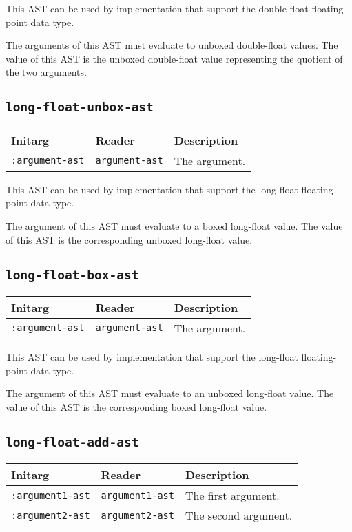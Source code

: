 This AST can be used by implementation that support the double-float
floating-point data type.  

The arguments of this AST must evaluate to unboxed double-float
values.  The value of this AST is the unboxed double-float value
representing the quotient of the two arguments.

\subsection{\texttt{long-float-unbox-ast}}
\label{sec-ast-long-float-unbox}

\begin{tabular}{|l|l|l|}
\hline
Initarg & Reader & Description\\
\hline\hline
\texttt{:argument-ast} & \texttt{argument-ast} & The argument.\\
\hline
\end{tabular}

This AST can be used by implementation that support the long-float
floating-point data type.  

The argument of this AST must evaluate to a boxed long-float value.
The value of this AST is the corresponding unboxed long-float value.

\subsection{\texttt{long-float-box-ast}}
\label{sec-ast-long-float-box}

\begin{tabular}{|l|l|l|}
\hline
Initarg & Reader & Description\\
\hline\hline
\texttt{:argument-ast} & \texttt{argument-ast} & The argument.\\
\hline
\end{tabular}

This AST can be used by implementation that support the long-float
floating-point data type.  

The argument of this AST must evaluate to an unboxed long-float
value.  The value of this AST is the corresponding boxed long-float
value.

\subsection{\texttt{long-float-add-ast}}
\label{sec-ast-long-float-add}

\begin{tabular}{|l|l|l|}
\hline
Initarg & Reader & Description\\
\hline\hline
\texttt{:argument1-ast} & \texttt{argument1-ast} & The first argument.\\
\hline
\texttt{:argument2-ast} & \texttt{argument2-ast} & The second argument.\\
\hline
\end{tabular}

